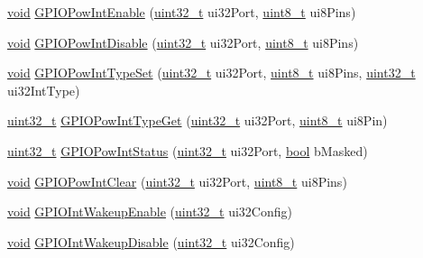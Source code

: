 \begin{DoxyCompactItemize}
\item 
\hyperlink{usb__devapi_8h_afabf60e7f57651d6d595a02c75f07cd0}{void} \hyperlink{group__gpio__api_ga3e72dadb25c421d27e4346e96a8014e1}{G\+P\+I\+O\+Pow\+Int\+Enable} (\hyperlink{_p_e___types_8h_a33594304e786b158f3fb30289278f5af}{uint32\+\_\+t} ui32\+Port, \hyperlink{_p_e___types_8h_aba7bc1797add20fe3efdf37ced1182c5}{uint8\+\_\+t} ui8\+Pins)
\item 
\hyperlink{usb__devapi_8h_afabf60e7f57651d6d595a02c75f07cd0}{void} \hyperlink{group__gpio__api_gaa224fc9fa3565a968bdd49cdaa42cc80}{G\+P\+I\+O\+Pow\+Int\+Disable} (\hyperlink{_p_e___types_8h_a33594304e786b158f3fb30289278f5af}{uint32\+\_\+t} ui32\+Port, \hyperlink{_p_e___types_8h_aba7bc1797add20fe3efdf37ced1182c5}{uint8\+\_\+t} ui8\+Pins)
\item 
\hyperlink{usb__devapi_8h_afabf60e7f57651d6d595a02c75f07cd0}{void} \hyperlink{group__gpio__api_gadf6a7664e1f109e2606e06d8651acfa3}{G\+P\+I\+O\+Pow\+Int\+Type\+Set} (\hyperlink{_p_e___types_8h_a33594304e786b158f3fb30289278f5af}{uint32\+\_\+t} ui32\+Port, \hyperlink{_p_e___types_8h_aba7bc1797add20fe3efdf37ced1182c5}{uint8\+\_\+t} ui8\+Pins, \hyperlink{_p_e___types_8h_a33594304e786b158f3fb30289278f5af}{uint32\+\_\+t} ui32\+Int\+Type)
\item 
\hyperlink{_p_e___types_8h_a33594304e786b158f3fb30289278f5af}{uint32\+\_\+t} \hyperlink{group__gpio__api_ga7c3716ecbe1843e670936a2abfd63398}{G\+P\+I\+O\+Pow\+Int\+Type\+Get} (\hyperlink{_p_e___types_8h_a33594304e786b158f3fb30289278f5af}{uint32\+\_\+t} ui32\+Port, \hyperlink{_p_e___types_8h_aba7bc1797add20fe3efdf37ced1182c5}{uint8\+\_\+t} ui8\+Pin)
\item 
\hyperlink{_p_e___types_8h_a33594304e786b158f3fb30289278f5af}{uint32\+\_\+t} \hyperlink{group__gpio__api_gadadc7070b1732d344b2890b0d4a45681}{G\+P\+I\+O\+Pow\+Int\+Status} (\hyperlink{_p_e___types_8h_a33594304e786b158f3fb30289278f5af}{uint32\+\_\+t} ui32\+Port, \hyperlink{_p_e___types_8h_a97a80ca1602ebf2303258971a2c938e2}{bool} b\+Masked)
\item 
\hyperlink{usb__devapi_8h_afabf60e7f57651d6d595a02c75f07cd0}{void} \hyperlink{group__gpio__api_ga5ab6595763c4d040bff3862784dfb77b}{G\+P\+I\+O\+Pow\+Int\+Clear} (\hyperlink{_p_e___types_8h_a33594304e786b158f3fb30289278f5af}{uint32\+\_\+t} ui32\+Port, \hyperlink{_p_e___types_8h_aba7bc1797add20fe3efdf37ced1182c5}{uint8\+\_\+t} ui8\+Pins)
\item 
\hyperlink{usb__devapi_8h_afabf60e7f57651d6d595a02c75f07cd0}{void} \hyperlink{group__gpio__api_gaee8e2084b5316d970d4bc479c3ae7934}{G\+P\+I\+O\+Int\+Wakeup\+Enable} (\hyperlink{_p_e___types_8h_a33594304e786b158f3fb30289278f5af}{uint32\+\_\+t} ui32\+Config)
\item 
\hyperlink{usb__devapi_8h_afabf60e7f57651d6d595a02c75f07cd0}{void} \hyperlink{group__gpio__api_gaacc37245da8b1a7c75211927eb8d513a}{G\+P\+I\+O\+Int\+Wakeup\+Disable} (\hyperlink{_p_e___types_8h_a33594304e786b158f3fb30289278f5af}{uint32\+\_\+t} ui32\+Config)
\end{DoxyCompactItemize}


